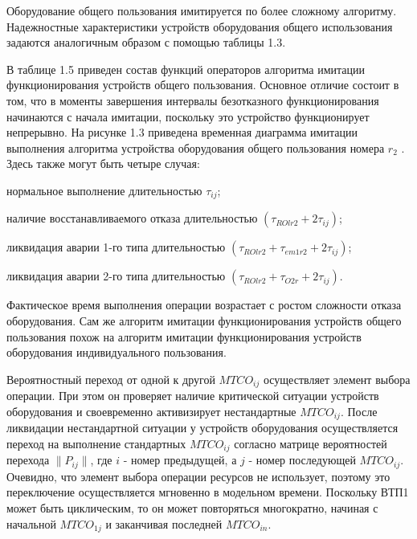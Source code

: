 Оборудование общего пользования имитируется по более сложному алгоритму. Надежностные характеристики устройств оборудования общего использования задаются аналогичным образом с помощью таблицы 1.3.

В таблице 1.5 приведен состав функций операторов алгоритма имитации функционирования устройств общего пользования. Основное отличие состоит в том, что в моменты завершения интервалы безотказного функционирования начинаются с начала имитации, поскольку это устройство функционирует непрерывно. На рисунке 1.3 приведена временная диаграмма имитации выполнения алгоритма устройства оборудования общего пользования номера $r_2$ . Здесь также могут быть четыре случая:
\begin{textitemize}
    \item нормальное выполнение длительностью $\tau_{ij}$;
    \item наличие восстанавливаемого отказа длительностью  $(\tau_{ROlr2} + 2 \tau_{ij})$;
    \item ликвидация аварии 1-го типа длительностью  $(\tau_{ROlr2} + \tau_{em1r2} + 2 \tau_{ij})$;
    \item ликвидация аварии 2-го типа длительностью $(\tau_{ROlr2} + \tau_{O2r} + 2 \tau_{ij})$.
\end{textitemize}


Фактическое время выполнения операции возрастает с ростом сложности отказа оборудования. Сам же алгоритм имитации функционирования устройств общего пользования похож на алгоритм имитации функционирования устройств оборудования индивидуального пользования.




Вероятностный переход от одной к другой $MTCO_{ij}$ осуществляет элемент выбора операции. При этом он проверяет наличие критической ситуации устройств оборудования и своевременно активизирует нестандартные $MTCO_{ij}$.  После ликвидации нестандартной ситуации у устройств оборудования осуществляется переход на выполнение стандартных $MTCO_{ij}$ согласно матрице вероятностей перехода $\parallel P_{ij} \parallel $, где $i$ - номер предыдущей, а $j$ - номер последующей $MTCO_{ij}$.  Очевидно, что элемент выбора операции ресурсов не использует, поэтому это переключение осуществляется мгновенно в модельном времени.  Поскольку ВТП1 может быть циклическим, то он может повторяться многократно, начиная с начальной $MTCO_{1j}$ и заканчивая последней $MTCO_{in}$.

